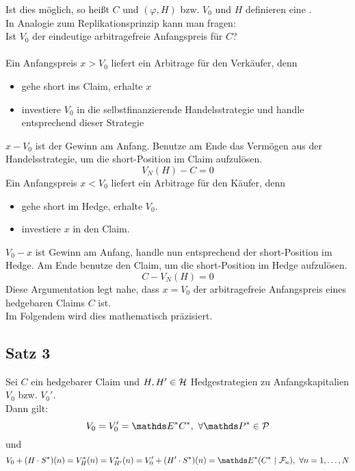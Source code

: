 Ist dies möglich, so heißt $C$  und $(\varphi,H)$ bzw. $V_0$ und $H$ definieren eine .\\
In Analogie zum Replikationsprinzip kann man fragen:\\
Ist $V_0$ der eindeutige arbitragefreie Anfangspreis für $C$?\\

\\
Ein Anfangspreis $x>V_0$ liefert ein Arbitrage für den Verkäufer, denn 
\begin{itemize}
	\item gehe short ins Claim, erhalte $x$
	\item investiere $V_0$ in die selbstfinanzierende Handelsstrategie und handle entsprechend dieser Strategie
\end{itemize}
$x-V_0$ ist der Gewinn am Anfang.
Benutze am Ende das Vermögen aus der Handelsstrategie, um die short-Position im Claim aufzulösen.
\[
V_N(H)-C=0
\]
Ein Anfangspreis $x<V_0$ liefert ein Arbitrage für den Käufer, denn
\begin{itemize}
	\item gehe short im Hedge, erhalte $V_0$.
	\item investiere $x$ in den Claim.
\end{itemize}
$V_0-x$ ist Gewinn am Anfang, handle nun entsprechend der short-Position im Hedge.
Am Ende benutze den Claim, um die short-Position im Hedge aufzulösen.
\[
C-V_N(H)=0
\]
Diese Argumentation legt nahe, dass $x=V_0$ der arbitragefreie Anfangspreis eines hedgebaren Claims $C$ ist.\\
Im Folgendem wird dies mathematisch präzisiert.

\subsection{Satz 3}
\label{sub:satz_3}
Sei $C$ ein hedgebarer Claim und $H,H'\in \mathcal{H}$ Hedgestrategien zu Anfangskapitalien $V_0$ bzw. $V_0'$.\\
Dann gilt:
\[
V_0=V_0'=\E^*C^*,~\forall \Pw^*\in\mc{P}
\]
und
\[
V_0+(H\cdot S^*)(n)=V_H^*(n)=V_{H'}^*(n)=V_0'+(H'\cdot S^*)(n)=\E^*(C^*~|~\F_n),~\forall n=1,\dots,N
\]

